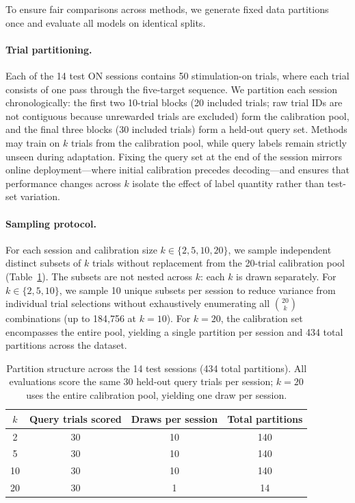 \documentclass{article}
\begin{document}
To ensure fair comparisons across methods, we generate fixed data partitions once and evaluate all models on identical splits.

\paragraph{Trial partitioning.} 
Each of the 14 test ON sessions contains 50 stimulation-on trials, where each trial consists of one pass through the five-target sequence. We partition each session chronologically: the first two 10-trial blocks (20 included trials; raw trial IDs are not contiguous because unrewarded trials are excluded) form the calibration pool, and the final three blocks (30 included trials) form a held-out query set. Methods may train on $k$ trials from the calibration pool, while query labels remain strictly unseen during adaptation. Fixing the query set at the end of the session mirrors online deployment—where initial calibration precedes decoding—and ensures that performance changes across $k$ isolate the effect of label quantity rather than test-set variation.

\paragraph{Sampling protocol.} 
For each session and calibration size $k \in \{2, 5, 10, 20\}$, we sample independent distinct subsets of $k$ trials without replacement from the 20-trial calibration pool (Table~\ref{tab:draws}). The subsets are not nested across $k$: each $k$ is drawn separately. For $k \in \{2, 5, 10\}$, we sample 10 unique subsets per session to reduce variance from individual trial selections without exhaustively enumerating all $\binom{20}{k}$ combinations (up to 184,756 at $k=10$). For $k=20$, the calibration set encompasses the entire pool, yielding a single partition per session and 434 total partitions across the dataset.

\begin{table}[htbp]
\centering
\caption{Partition structure across the 14 test sessions (434 total partitions). All evaluations score the same 30 held-out query trials per session; $k=20$ uses the entire calibration pool, yielding one draw per session.}
\begin{tabular}{@{}cccc@{}}
\toprule
$k$ & Query trials scored & Draws per session & Total partitions \\ 
\midrule
2  & 30 & 10 & 140 \\ 
5  & 30 & 10 & 140 \\ 
10 & 30 & 10 & 140 \\ 
20 & 30 & 1  & 14  \\
\bottomrule
\end{tabular}
\label{tab:draws}
\end{table}
\end{document}
